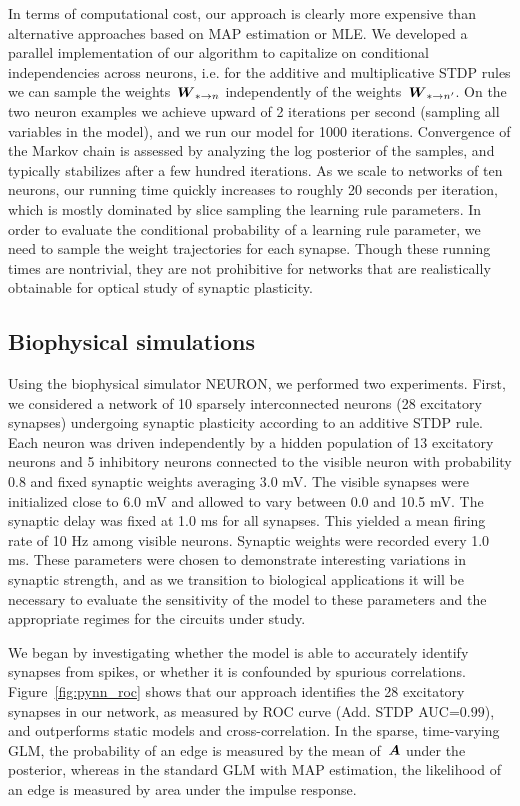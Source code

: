 In terms of computational cost, our approach is clearly more expensive
than alternative approaches based on MAP estimation or MLE. We
developed a parallel implementation of our algorithm to capitalize on
conditional independencies across neurons, i.e. for the additive and
multiplicative STDP rules we can sample the weights~${\boldsymbol{W}_{*\to n}}$
independently of the weights~${\boldsymbol{W}_{*\to n'}}$. On the two neuron
examples we achieve upward of 2 iterations per second (sampling all
variables in the model), and we run our model for 1000
iterations. Convergence of the Markov chain is assessed by analyzing
the log posterior of the samples, and typically stabilizes after a few
hundred iterations. As we scale to networks of ten neurons, our
running time quickly increases to roughly 20 seconds per iteration,
which is mostly dominated by slice sampling the learning rule
parameters. In order to evaluate the conditional probability of a
learning rule parameter, we need to sample the weight trajectories for
each synapse. Though these running times are nontrivial, they are not
prohibitive for networks that are realistically obtainable for optical
study of synaptic plasticity.

\subsection{Biophysical simulations}
Using the biophysical simulator NEURON, we performed two
experiments. First, we considered a network of 10 sparsely
interconnected neurons (28 excitatory synapses) undergoing synaptic
plasticity according to an additive STDP rule. Each neuron was driven
independently by a hidden population of 13 excitatory neurons and 5
inhibitory neurons connected to the visible neuron with probability
0.8 and fixed synaptic weights averaging 3.0 mV. The visible synapses
were initialized close to 6.0 mV and allowed to vary between 0.0 and
10.5 mV. The synaptic delay was fixed at 1.0 ms for all synapses. This
yielded a mean firing rate of 10 Hz among visible neurons. Synaptic
weights were recorded every 1.0 ms.  These parameters were chosen to
demonstrate interesting variations in synaptic strength, and as we
transition to biological applications it will be necessary to evaluate
the sensitivity of the model to these parameters and the appropriate
regimes for the circuits under study.

We began by investigating whether the model is able to accurately
identify synapses from spikes, or whether it is confounded by spurious
correlations.  Figure~\ref{fig:pynn_roc} shows that our approach
identifies the 28 excitatory synapses in our network, as measured by
ROC curve (Add. STDP AUC=${0.99}$), and
outperforms static models and cross-correlation.  In the sparse,
time-varying GLM, the probability of an edge is measured by the mean
of~$\boldsymbol{A}$ under the posterior, whereas in the standard GLM with MAP
estimation, the likelihood of an edge is measured by area under the
impulse response.

